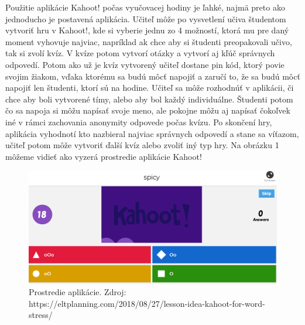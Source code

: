 \documentclass[10pt,oneside,slovak,a4paper]{article}
\begin{document}
Použitie aplikácie Kahoot! počas vyučovacej hodiny je ľahké, najmä preto ako jednoducho je postavená aplikácia\cite{Licorish}. Učiteľ môže po vysvetlení učiva študentom vytvoriť hru v Kahoot!, kde si vyberie jednu zo 4 možností, ktorá mu pre daný moment vyhovuje najviac, napríklad ak chce aby si študenti preopakovali učivo, tak si zvolí kvíz. V kvíze potom vytvorí otázky a vytvorí aj kľúč správnych odpovedí. Potom ako už je kvíz vytvorený učiteľ dostane pin kód, ktorý povie svojim žiakom, vďaka ktorému sa budú môcť napojiť a zaručí to, že sa budú môcť napojiť len študenti, ktorí sú na hodine. Učiteľ sa môže rozhodnúť v aplikácii, či chce aby boli vytvorené tímy, alebo aby bol každý individuálne. Študenti potom čo sa napoja si môžu napísať svoje meno, ale pokojne môžu aj napísať čokoľvek iné v rámci zachovania anonymity odpovede  počas kvízu\cite{WANG2020}. Po skončení hry, aplikácia vyhodnotí kto nazbieral najviac správnych odpovedí a stane sa víťazom, učiteľ potom môže vytvoriť ďalší kvíz alebo zvoliť iný typ hry. Na obrázku 1 môžeme vidieť ako vyzerá prostredie aplikácie Kahoot!
\begin{figure}[h] %
\centering
\includegraphics[width=\textwidth]{kahoot.png}
\caption{ Prostredie aplikácie.
Zdroj: https://eltplanning.com/2018/08/27/lesson-idea-kahoot-for-word-stress/
}

\end{figure}
\end{document}
